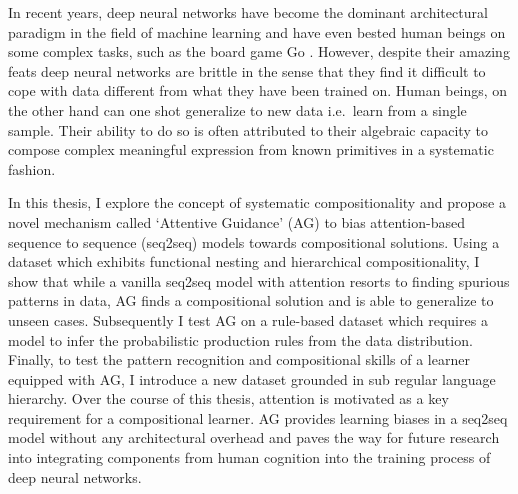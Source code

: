 	In recent years, deep neural networks have become the dominant architectural paradigm in the field of machine learning and have even bested human beings on some complex tasks, such as the board game Go \citep{Silver2016}. However, despite their amazing feats deep neural networks are brittle in the sense that they find it difficult to cope with data different from what they have been trained on. Human beings, on the other hand can one shot generalize to new data i.e.\ learn from a single sample. Their ability to do so is often attributed to  their algebraic capacity \citep{marcus2003algebraic} to compose complex meaningful expression from known primitives in a systematic fashion.
	
	In this thesis, I explore the concept of systematic compositionality and propose a novel mechanism called \lq Attentive Guidance\rq{} (AG) to bias attention-based sequence to sequence (seq2seq) models towards compositional solutions. Using a dataset which exhibits functional nesting and hierarchical compositionality, I show that while a vanilla seq2seq model with attention resorts to finding spurious patterns in data, AG finds a compositional solution and is able to generalize to unseen cases. Subsequently I test AG on a rule-based dataset which requires a model to infer the probabilistic production rules from the data distribution. Finally, to test the pattern recognition and compositional skills of a learner equipped with AG, I introduce a new dataset grounded in sub regular language hierarchy. Over the course of this thesis, attention is motivated as a key requirement for a compositional learner. AG provides learning biases in a seq2seq model without any architectural overhead and paves the way for future research into integrating components from human cognition into the training process of deep neural networks.


